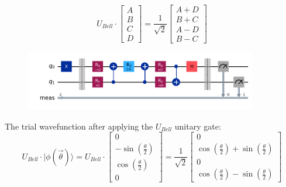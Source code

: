 \documentclass{article}
\begin{document}
\begin{itemize}
	      \begin{equation*}
            U_{Bell} \cdot \begin{bmatrix}
			      A \\
			      B \\
			      C \\
			      D
		      \end{bmatrix}
		      =
		      \frac{1}{\sqrt{2}}\begin{bmatrix}
			      A + D \\
			      B + C \\
			      A - D \\
			      B - C
		      \end{bmatrix}
	      \end{equation*}
	      \begin{figure}[H]
		      \centering
		      \includegraphics[width=0.9\textwidth, height=0.25\textheight]{BellM.png}
	      \end{figure}
          The trial wavefunction after applying the \(U_{Bell}\) unitary gate:
          \begin{equation*}
            U_{Bell} \cdot |\phi(\vec{\theta})\rangle = U_{Bell} \cdot \begin{bmatrix}
                0 \\
                -\sin\left(\frac{\theta}{2}\right) \\
                \cos\left(\frac{\theta}{2}\right) \\
                0
            \end{bmatrix}
            = \frac{1}{\sqrt{2}}
            \begin{bmatrix}
                0 \\
                \cos\left(\frac{\theta}{2}\right) + \sin\left(\frac{\theta}{2}\right) \\
                0 \\
                \cos\left(\frac{\theta}{2}\right) - \sin\left(\frac{\theta}{2}\right) 
            \end{bmatrix}
          \end{equation*}
	      \begin{figure}[H]

\end{figure}
\end{itemize}
\end{document}
